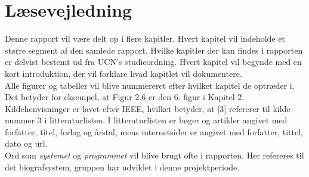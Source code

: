\newpage
\section*{Læsevejledning}
Denne rapport vil være delt op i flere kapitler. Hvert kapitel vil indeholde et større segment af den samlede rapport.
Hvilke kapitler der kan findes i rapporten er delvist bestemt ud fra UCN's studieordning. 
Hvert kapitel vil begynde med en kort introduktion, der vil forklare hvad kapitlet vil dokumentere.\\ 

Alle figurer og tabeller vil blive nummereret efter hvilket kapitel de optræder i. Det betyder for eksempel, at Figur 2.6 er den 
6. figur i Kapitel 2. \\

Kildehenvisninger er lavet efter IEEE, hvilket betyder, at [3] refererer til kilde nummer 3 i litteraturlisten. 
I litteraturlisten er bøger og artikler angivet med forfatter, titel, forlag og årstal, mens internetsider er angivet med forfatter, tittel, dato og url. \\ 

Ord som \textit{systemet} og \textit{programmet} vil blive brugt ofte i rapporten. Her refereres til det biografsystem, gruppen har udviklet i denne projektperiode.